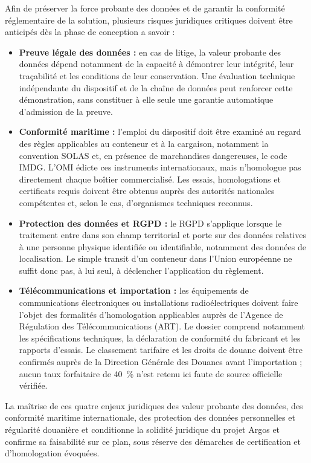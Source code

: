 Afin de préserver la force probante des données et de garantir la conformité réglementaire de la solution, plusieurs risques juridiques critiques doivent être anticipés dès la phase de conception a savoir :
\begin{itemize}
    \item \textbf{Preuve légale des données :} en cas de litige, la valeur probante des données dépend notamment de la capacité à démontrer leur intégrité, leur traçabilité et les conditions de leur conservation. Une évaluation technique indépendante du dispositif et de la chaîne de données peut renforcer cette démonstration, sans constituer à elle seule une garantie automatique d'admission de la preuve.
    \item \textbf{Conformité maritime :} l'emploi du dispositif doit être examiné au regard des règles applicables au conteneur et à la cargaison, notamment la convention SOLAS et, en présence de marchandises dangereuses, le code IMDG\cite{imo_solas,imo_imdg}. L'OMI édicte ces instruments internationaux, mais n'homologue pas directement chaque boîtier commercialisé. Les essais, homologations et certificats requis doivent être obtenus auprès des autorités nationales compétentes et, selon le cas, d'organismes techniques reconnus.
    \item \textbf{Protection des données et RGPD :} le RGPD s'applique lorsque le traitement entre dans son champ territorial et porte sur des données relatives à une personne physique identifiée ou identifiable, notamment des données de localisation. Le simple transit d'un conteneur dans l'Union européenne ne suffit donc pas, à lui seul, à déclencher l'application du règlement\cite{rgpd_officiel}.
    \item \textbf{Télécommunications et importation :} les équipements de communications électroniques ou installations radioélectriques doivent faire l'objet des formalités d'homologation applicables auprès de l'Agence de Régulation des Télécommunications (ART). Le dossier comprend notamment les spécifications techniques, la déclaration de conformité du fabricant et les rapports d'essais\cite{art_homologation}. Le classement tarifaire et les droits de douane doivent être confirmés auprès de la Direction Générale des Douanes avant l'importation ; aucun taux forfaitaire de 40~\% n'est retenu ici faute de source officielle vérifiée.
\end{itemize}

La maîtrise de ces quatre enjeux juridiques des valeur probante des données, des conformité maritime internationale, des protection des données personnelles et régularité douanière et conditionne la solidité juridique du projet Argos et confirme sa faisabilité sur ce plan, sous réserve des démarches de certification et d'homologation évoquées.

